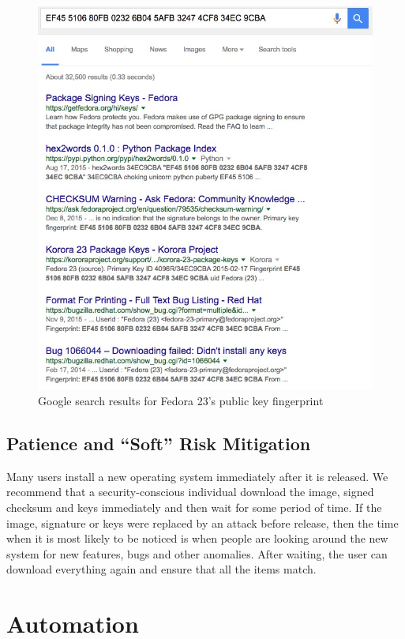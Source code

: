 \documentclass[conference]{IEEEtran}
\begin{document}
\begin{figure}[h!]
\includegraphics[width=\linewidth]{./images/google_key.jpg}
    \caption{Google search results for Fedora 23's public key fingerprint}
\label{fedora_google}
\end{figure}


\subsection{Patience and ``Soft'' Risk Mitigation}

Many users install a new operating system immediately after it is released. We recommend
that a security-conscious individual download the image, signed checksum and keys immediately
and then wait for some period of time. If the image, signature or keys were replaced by an
attack before release, then the time when it is most likely to be noticed is when people
are looking around the new system for new features, bugs and other anomalies. After waiting,
the user can download everything again and ensure that all the items match.

\section{Automation}
\end{document}
